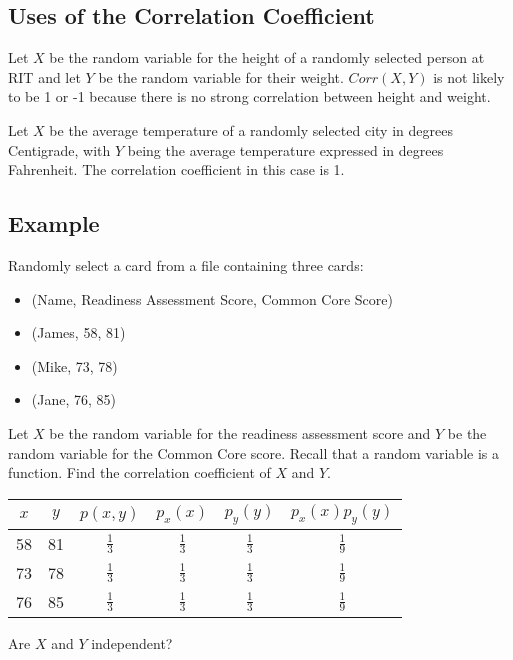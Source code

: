 \documentclass[letterpaper, 12pt]{math}
\begin{document}
\subsection*{Uses of the Correlation Coefficient}
Let \( X \) be the random variable for the height of a randomly selected person
at RIT and let \( Y \) be the random variable for their weight. \( Corr(X,Y) \)
is not likely to be 1 or -1 because there is no strong correlation between
height and weight. \par
Let \( X \) be the average temperature of a randomly selected city in degrees
Centigrade, with \( Y \) being the average temperature expressed in degrees
Fahrenheit. The correlation coefficient in this case is 1.

\subsection*{Example}
Randomly select a card from a file containing three cards:
\begin{itemize}
  \item (Name, Readiness Assessment Score, Common Core Score)
  \item (James, 58, 81)
  \item (Mike, 73, 78)
  \item (Jane, 76, 85)
\end{itemize}
Let \( X \) be the random variable for the readiness assessment score and
\( Y \) be the random variable for the Common Core score. Recall that a random
variable is a function. Find the correlation coefficient of \( X \) and \( Y \).
\begin{center}
  {\renewcommand{\arraystretch}{2}
  \begin{tabular}{|c|c|c|c|c|c|}
    \hline
    \( x \) & \( y \) & \( p(x,y) \) & \( p_{x}(x) \) & \( p_{y}(y) \) &
      \( p_{x}(x)p_{y}(y) \) \\
    \hline
    58 & 81 & \( \frac{1}{3} \) & \( \frac{1}{3} \) & \( \frac{1}{3} \) &
      \( \frac{1}{9} \) \\
    \hline
    73 & 78 & \( \frac{1}{3} \) & \( \frac{1}{3} \) & \( \frac{1}{3} \) &
      \( \frac{1}{9} \) \\
    \hline
    76 & 85 & \( \frac{1}{3} \) & \( \frac{1}{3} \) & \( \frac{1}{3} \) &
      \( \frac{1}{9} \) \\
    \hline
  \end{tabular}}
\end{center}
Are \( X \) and \( Y \) independent? \\
\end{document}
